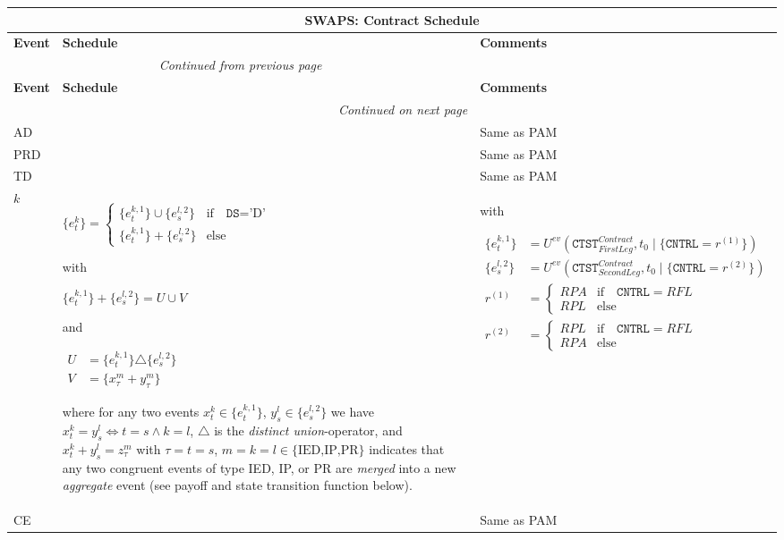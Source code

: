 \documentclass[9pt,oneside]{amsart}
\newenvironment{schedule}[1]{
	\hfill %
	\begin{longtable}{| p{0.05\textwidth} | p{0.5\textwidth} |  p{0.4\textwidth} |}
	\multicolumn{3}{c}{\textbf{#1: Contract Schedule}}\\
	\hline
	\textbf{Event} & \textbf{Schedule} & \textbf{Comments} \\
	\hline
	\endfirsthead
	\multicolumn{2}{c}{\textit{Continued from previous page}} \\
	\hline
	\textbf{Event} & \textbf{Schedule} & \textbf{Comments} \\
	\hline
	\endhead
	\hline \multicolumn{2}{r}{\textit{Continued on next page}} \\
	\endfoot
	\endlastfoot
}{%
	\hline
	\end{longtable}
}
\newcommand{\attr}[1]{\texttt{#1}}
\newcommand{\cldev}[3]{U^{ev}(#1,#2 \mid\{#3\})}
\begin{document}
\begin{schedule}{SWAPS}
	AD & & Same as PAM \\
	\hline
	PRD & & Same as PAM \\
	\hline
	TD & & Same as PAM \\
	\hline
	$k$ & $\{e_t^k\} = \begin{cases}
				\{e_t^{k,1}\}\cup \{e_s^{l,2}\} & \text{if}\quad \attr{DS}=\text{'D'} \\
				\{e_t^{k,1}\} + \{e_s^{l,2}\} & \text{else} \end{cases}$ \par
	with\par
	$\{e_t^{k,1}\}+\{e_s^{l,2}\} = U \cup V$\par
	and\par
	{$\begin{aligned}
		U &= \{e_t^{k,1}\} \triangle \{e_s^{l,2}\}\\
		V &= \{x_\tau^m+y_\tau^m\}
	\end{aligned}$} \par
	where for any two events $x_t^k\in\{e_t^{k,1}\}$, $y_s^l\in\{e_s^{l,2}\}$ we have $x_t^k=y_s^l \iff t=s \land k=l$, $\triangle$ is the \textit{distinct union}-operator, and $x_t^k+y_s^l=z_\tau^m$ with $\tau=t=s$, $m=k=l\in\{\text{IED,IP,PR}\}$ indicates that any two congruent events of type IED, IP, or PR are \textit{merged} into a new \textit{aggregate} event (see payoff and state transition function below).
		& with\par
			{$\begin{aligned}
				\{e_t^{k,1}\} &= \cldev{\attr{CTST}_{FirstLeg}^{Contract}}{t_0}{\attr{CNTRL}=r^{(1)}} \\
				\{e_s^{l,2}\} &= \cldev{\attr{CTST}_{SecondLeg}^{Contract}}{t_0}{\attr{CNTRL}=r^{(2)}} \\
				r^{(1)} &= \begin{cases} RPA & \text{if}\quad \attr{CNTRL}=RFL \\
					RPL & \text{else} \end{cases} \\
				r^{(2)} &= \begin{cases} RPL & \text{if}\quad \attr{CNTRL}=RFL \\
					RPA & \text{else} \end{cases}
			\end{aligned}$} \\
	\hline
	CE & & Same as PAM \\
\end{schedule}
\end{document}
